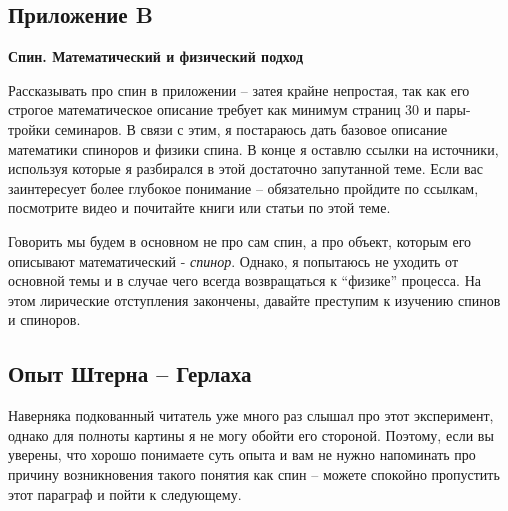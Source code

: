 \setcounter{figure}{0}  
\begin{center}
    \section{Приложение B}\label{appendix:B}
    \textbf{\Large{Спин. Математический и физический подход}}
\end{center}

Рассказывать про спин в приложении -- затея крайне непростая, так как его строгое математическое описание требует как минимум страниц 30 и пары-тройки семинаров. В связи с этим, я постараюсь дать базовое описание математики спиноров и физики спина. В конце я оставлю ссылки на источники, используя которые я разбирался в этой достаточно запутанной теме. Если вас заинтересует более глубокое понимание -- обязательно пройдите по ссылкам, посмотрите видео и почитайте книги или статьи по этой теме. 

Говорить мы будем в основном не про сам спин, а про объект, которым его описывают математический -  \textit{спинор}. Однако, я попытаюсь не уходить от основной темы и в случае чего всегда возвращаться к ``физике'' процесса. На этом лирические отступления закончены, давайте преступим к изучению спинов и спиноров.

\subsection{Опыт Штерна -- Герлаха}
\hspace{1em} Наверняка подкованный читатель уже много раз слышал про этот эксперимент, однако для полноты картины я не могу обойти его стороной. Поэтому, если вы уверены, что хорошо понимаете суть опыта и вам не нужно напоминать про причину возникновения такого понятия как спин -- можете спокойно пропустить этот параграф и пойти к следующему.

